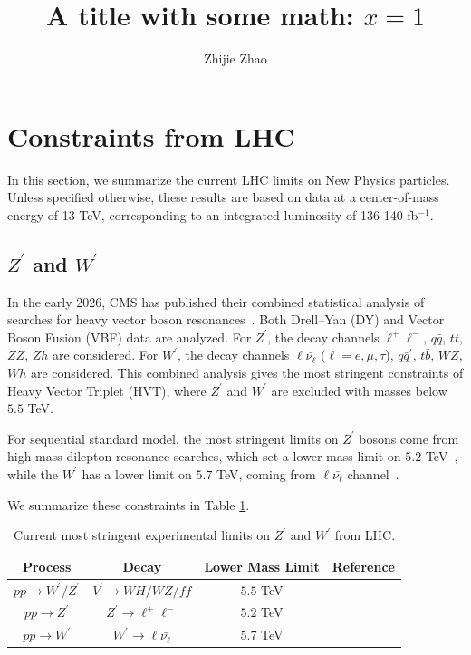 \documentclass[a4paper,11pt]{article}
\title{\boldmath A title with some math: $x=1$}
\author{Zhijie Zhao}
\affiliation{Henan Normal University,\\
453007 Xinxiang, China}
\begin{document}
\maketitle
\flushbottom

\section{Constraints from LHC}
\label{sec:intro}

In this section, we summarize the current LHC limits on New Physics particles. 
Unless specified otherwise, these results are based on data at a center-of-mass energy of 13 TeV, corresponding to an integrated luminosity of 136-140 fb$^{-1}$. 

\subsection{$Z^\prime$ and $W^\prime$}
In the early 2026, CMS has published their combined statistical analysis of searches for heavy vector boson resonances~\cite{CMS:2026fjw}. 
Both Drell–Yan (DY) and Vector Boson Fusion (VBF) data are analyzed.
For $Z^\prime$, the decay channels $\ell^+\ell^-$, $q\bar{q}$, $t\bar{t}$, $ZZ$, $Zh$ are considered. 
For $W^\prime$, the decay channels $\ell\bar{\nu_\ell}$ ($\ell=e,\mu,\tau$), $q\bar{q}^\prime$, $t\bar{b}$, $WZ$, $Wh$ are considered. 
This combined analysis gives the most stringent constraints of Heavy Vector Triplet (HVT), 
where $Z^\prime$ and $W^\prime$ are excluded with masses below $5.5$ TeV.

For sequential standard model, the most stringent limits on $Z^\prime$ bosons come from high-mass dilepton resonance searches, 
which set a lower mass limit on $5.2$ TeV~\cite{CMS:2021ctt}, 
while the $W^\prime$ has a lower limit on $5.7$ TeV, coming from $\ell\bar{\nu_\ell}$ channel~\cite{CMS:2022krd}. 

We summarize these constraints in Table \ref{table:Vprime}. 

\begin{table}
  \centering 
    \begin{tabular}{cccc}
    Process  & Decay & Lower Mass Limit & Reference \\
     \hline
    $pp\to W^\prime/Z^\prime$ & $V^\prime\to WH/WZ/ff$ & $5.5$ TeV & \cite{CMS:2026fjw} \\
$pp\to Z^\prime$  & $Z^\prime\to\ell^+\ell^-$ &   
$5.2$ TeV       &     \cite{CMS:2021ctt}        \\%
$pp\to W^\prime$  & $W^\prime\to\ell\bar{\nu_\ell}$ &   
$5.7$ TeV       &     \cite{CMS:2022krd}         \\%
    \hline
    \end{tabular}
      \caption{Current most stringent experimental limits on $Z^\prime$ and $W^\prime$ from LHC.}
      \label{table:Vprime}
  \end{table} 
\end{document}
